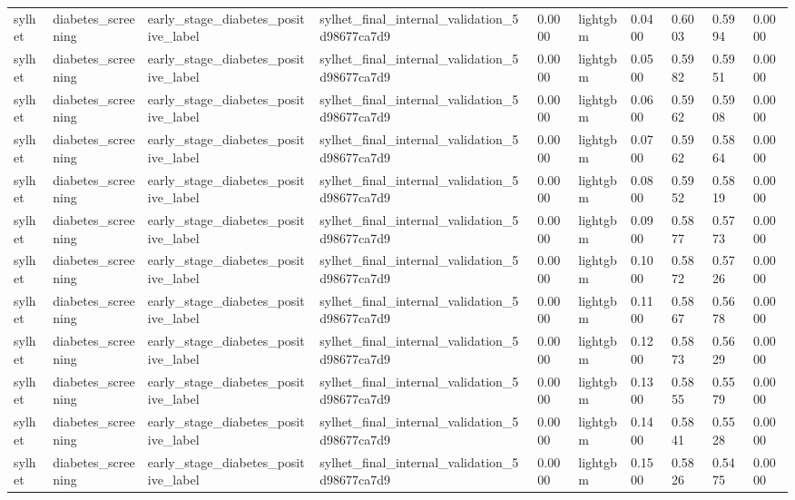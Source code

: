 \begin{tabular}{llllllllll}
sylhet & diabetes\_screening & early\_stage\_diabetes\_positive\_label & sylhet\_final\_internal\_validation\_5d98677ca7d9 & 0.0000 & lightgbm & 0.0400 & 0.6003 & 0.5994 & 0.0000 \\
sylhet & diabetes\_screening & early\_stage\_diabetes\_positive\_label & sylhet\_final\_internal\_validation\_5d98677ca7d9 & 0.0000 & lightgbm & 0.0500 & 0.5982 & 0.5951 & 0.0000 \\
sylhet & diabetes\_screening & early\_stage\_diabetes\_positive\_label & sylhet\_final\_internal\_validation\_5d98677ca7d9 & 0.0000 & lightgbm & 0.0600 & 0.5962 & 0.5908 & 0.0000 \\
sylhet & diabetes\_screening & early\_stage\_diabetes\_positive\_label & sylhet\_final\_internal\_validation\_5d98677ca7d9 & 0.0000 & lightgbm & 0.0700 & 0.5962 & 0.5864 & 0.0000 \\
sylhet & diabetes\_screening & early\_stage\_diabetes\_positive\_label & sylhet\_final\_internal\_validation\_5d98677ca7d9 & 0.0000 & lightgbm & 0.0800 & 0.5952 & 0.5819 & 0.0000 \\
sylhet & diabetes\_screening & early\_stage\_diabetes\_positive\_label & sylhet\_final\_internal\_validation\_5d98677ca7d9 & 0.0000 & lightgbm & 0.0900 & 0.5877 & 0.5773 & 0.0000 \\
sylhet & diabetes\_screening & early\_stage\_diabetes\_positive\_label & sylhet\_final\_internal\_validation\_5d98677ca7d9 & 0.0000 & lightgbm & 0.1000 & 0.5872 & 0.5726 & 0.0000 \\
sylhet & diabetes\_screening & early\_stage\_diabetes\_positive\_label & sylhet\_final\_internal\_validation\_5d98677ca7d9 & 0.0000 & lightgbm & 0.1100 & 0.5867 & 0.5678 & 0.0000 \\
sylhet & diabetes\_screening & early\_stage\_diabetes\_positive\_label & sylhet\_final\_internal\_validation\_5d98677ca7d9 & 0.0000 & lightgbm & 0.1200 & 0.5873 & 0.5629 & 0.0000 \\
sylhet & diabetes\_screening & early\_stage\_diabetes\_positive\_label & sylhet\_final\_internal\_validation\_5d98677ca7d9 & 0.0000 & lightgbm & 0.1300 & 0.5855 & 0.5579 & 0.0000 \\
sylhet & diabetes\_screening & early\_stage\_diabetes\_positive\_label & sylhet\_final\_internal\_validation\_5d98677ca7d9 & 0.0000 & lightgbm & 0.1400 & 0.5841 & 0.5528 & 0.0000 \\
sylhet & diabetes\_screening & early\_stage\_diabetes\_positive\_label & sylhet\_final\_internal\_validation\_5d98677ca7d9 & 0.0000 & lightgbm & 0.1500 & 0.5826 & 0.5475 & 0.0000 \\

\end{tabular}
